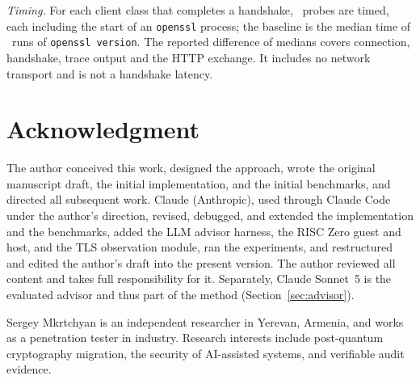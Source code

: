 \documentclass[journal]{IEEEtran}
\newcommand{\code}[1]{\texttt{\footnotesize #1}}
\begin{document}
\emph{Timing.} For each client class that completes a handshake, \TlsProbeN\ probes are timed, each including the start of an \code{openssl} process; the baseline is the median time of \TlsBaselineN\ runs of \code{openssl version}. The reported difference of medians covers connection, handshake, trace output and the HTTP exchange. It includes no network transport and is not a handshake latency.
\clearpage

\section*{Acknowledgment}
The author conceived this work, designed the approach, wrote the original manuscript draft, the initial implementation, and the initial benchmarks, and directed all subsequent work. Claude (Anthropic), used through Claude Code under the author's direction, revised, debugged, and extended the implementation and the benchmarks, added the LLM advisor harness, the RISC Zero guest and host, and the TLS observation module, ran the experiments, and restructured and edited the author's draft into the present version. The author reviewed all content and takes full responsibility for it. Separately, Claude Sonnet~5 is the evaluated advisor and thus part of the method (Section~\ref{sec:advisor}).



\begin{IEEEbiographynophoto}{Sergey Mkrtchyan}
is an independent researcher in Yerevan, Armenia, and works as a penetration tester in industry. Research interests include post-quantum cryptography migration, the security of AI-assisted systems, and verifiable audit evidence.
\end{IEEEbiographynophoto}
\end{document}
